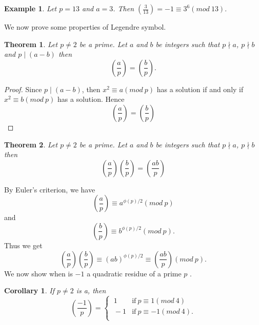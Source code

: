 \documentclass[12pt,letterpaper]{book}
\newtheorem{theorem}{Theorem}
\newtheorem{cor}{Corollary}
\newtheorem{example}{Example}
\begin{document}
\begin{example}
Let $p=13$ and $a=3$.  Then $\left(\frac{3}{13}\right)=-1\equiv
3^{6}(mod \ 13).$
\end{example}

We now prove some properties of Legendre symbol.

\begin{theorem}
Let $p\neq 2$ be a prime. Let $a$ and $b$ be integers such that
$p\nmid a$, $p\nmid b$ and $p\mid (a-b)$ then
\begin{equation*}
\left(\frac{a}{p}\right)=\left(\frac{b}{p}\right).
\end{equation*}
\end{theorem}

\begin{proof}
Since $p\mid (a-b)$, then $x^2\equiv a(mod \ p)$ has a solution if
and only if $x^2\equiv b(mod \ p)$ has a solution. Hence
\begin{equation*}
\left(\frac{a}{p}\right)=\left(\frac{b}{p}\right)
\end{equation*}
\end{proof}

\begin{theorem}
Let $p\neq 2$ be a prime. Let $a$ and $b$ be integers such that
$p\nmid a$, $p\nmid b$ then
\begin{equation*}
\left(\frac{a}{p}\right)\left(\frac{b}{p}\right)=\left(\frac{ab}{p}\right)
\end{equation*}
\end{theorem}

By Euler's criterion, we have
\begin{equation*}
\left(\frac{a}{p}\right)\equiv a^{\phi(p)/2}(mod \ p)
\end{equation*}
and
\begin{equation*}
\left(\frac{b}{p}\right)\equiv b^{\phi(p)/2}(mod \ p).
\end{equation*}
Thus we get
\begin{equation*}
\left(\frac{a}{p}\right)\left(\frac{b}{p}\right) \equiv
(ab)^{\phi(p)/2}\equiv \left(\frac{ab}{p}\right)(mod \ p).
\end{equation*}
We now show when is $-1$ a quadratic residue of a prime $p$ .

\begin{cor}
If $p\neq 2$ is a, then
\[\left(\frac{-1}{p}\right)=\left\{\begin{array}{lcr}
\ 1  &{\mbox{if}\  p\equiv 1(mod \ 4)} \\
\ -1  &{\mbox{if}\  p\equiv -1(mod \ 4)}. \\
\end{array}\right .\]
\end{cor}
\end{document}
